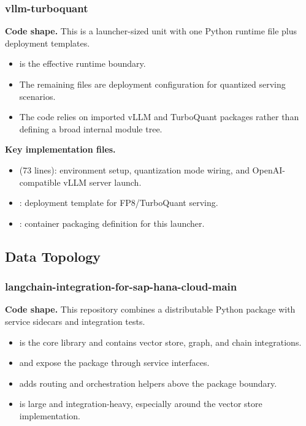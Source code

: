 \documentclass[11pt,a4paper]{article}
\begin{document}
\subsubsection{vllm-turboquant}

\textbf{Code shape.} This is a launcher-sized unit with one Python runtime file plus deployment templates.
\begin{itemize}[leftmargin=*]
    \item {} is the effective runtime boundary.
    \item The remaining files are deployment configuration for quantized serving scenarios.
    \item The code relies on imported vLLM and TurboQuant packages rather than defining a broad internal module tree.
\end{itemize}

\textbf{Key implementation files.}
\begin{itemize}[leftmargin=*]
    \item {} (73 lines): environment setup, quantization mode wiring, and OpenAI-compatible vLLM server launch.
    \item {}: deployment template for FP8/TurboQuant serving.
    \item {}: container packaging definition for this launcher.
\end{itemize}

\subsection{Data Topology}

\subsubsection{langchain-integration-for-sap-hana-cloud-main}

\textbf{Code shape.} This repository combines a distributable Python package with service sidecars and integration tests.
\begin{itemize}[leftmargin=*]
    \item {} is the core library and contains vector store, graph, and chain integrations.
    \item {} and  expose the package through service interfaces.
    \item {} adds routing and orchestration helpers above the package boundary.
    \item {} is large and integration-heavy, especially around the vector store implementation.
\end{itemize}
\end{document}
